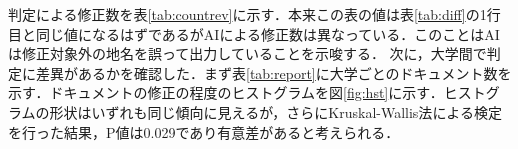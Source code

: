 判定による修正数を表\ref{tab:countrev}に示す．本来この表の値は表\ref{tab:diff}の1行目と同じ値になるはずであるがAIによる修正数は異なっている．このことはAIは修正対象外の地名を誤って出力していることを示唆する．
次に，大学間で判定に差異があるかを確認した．まず表\ref{tab:report}に大学ごとのドキュメント数を示す．ドキュメントの修正の程度のヒストグラムを図\ref{fig:hst}に示す．ヒストグラムの形状はいずれも同じ傾向に見えるが，さらにKruskal-Wallis法\cite{krunkallwallis}による検定を行った結果，P値は0.029であり有意差があると考えられる．
